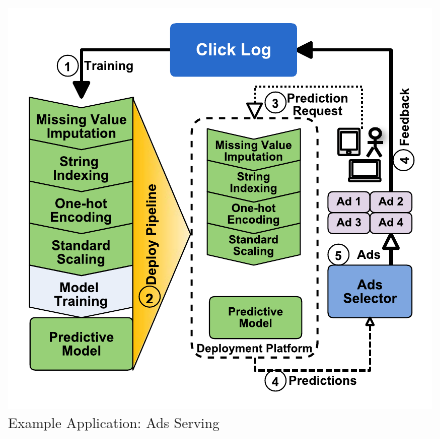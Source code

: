 \begin{figure}[h!]
\centering
\includegraphics[width=\columnwidth]{../images/motivational-example-vertical-small-cropped.pdf}
\caption{Example Application: Ads Serving}
\label{fig:motivational-example}
\end{figure}

